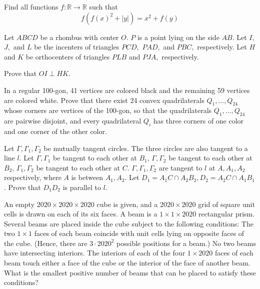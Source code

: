 \documentclass[11pt]{scrartcl}
\begin{document}
\begin{problem}[514210607042538]
Find all functions $f : \mathbb{R} \to \mathbb{R}$ such that
$$f(f(x)^2 + |y|) = x^2 + f(y)$$
\end{problem}
\begin{problem}[857598260795435]
Let $ ABCD $ be a rhombus with center $ O. $ $ P $ is a point lying on the side $ AB. $ Let $ I, $ $ J, $ and $ L $ be the incenters of triangles $ PCD, $ $ PAD, $ and $PBC, $ respectively. Let $ H $ and $ K $ be orthocenters of triangles $ PLB $ and $ PJA, $ respectively.

Prove that $ OI \perp HK. $
\end{problem}
\begin{problem}[2749225075653830789]
	In a regular 100-gon, 41 vertices are colored black and the remaining 59 vertices are colored white. Prove that there exist 24 convex quadrilaterals $Q_{1}, \ldots, Q_{24}$ whose corners are vertices of the 100-gon, so that
the quadrilaterals $Q_{1}, \ldots, Q_{24}$ are pairwise disjoint, and
every quadrilateral $Q_{i}$ has three corners of one color and one corner of the other color.
\end{problem}
\begin{problem}[1121095467606378762]
	Let $\Gamma, \Gamma_1, \Gamma_2$ be mutually tangent circles. The three circles are also tangent to a line $l$. Let $\Gamma, \Gamma_1$ be tangent to each other at $B_1$, $\Gamma, \Gamma_2$ be tangent to each other at $B_2$, $\Gamma_1, \Gamma_2$ be tangent to each other at $C$. $\Gamma, \Gamma_1, \Gamma_2$ are tangent to $l$ at $A, A_1, A_2$ respectively, where $A$ is between $A_1,A_2$. Let $D_1 = A_1C \cap A_2B_2, D_2 = A_2C \cap A_1B_1$. Prove that $D_1D_2$ is parallel to $l$.
\end{problem}
\begin{problem}[4320337590540710547]
	An empty $2020 \times 2020 \times 2020$ cube is given, and a $2020 \times 2020$ grid of square unit cells is drawn on each of its six faces. A beam is a $1 \times 1 \times 2020$ rectangular prism. Several beams are placed inside the cube subject to the following conditions:
The two $1 \times 1$ faces of each beam coincide with unit cells lying on opposite faces of the cube. (Hence, there are $3 \cdot {2020}^2$ possible positions for a beam.)
No two beams have intersecting interiors.
The interiors of each of the four $1 \times 2020$ faces of each beam touch either a face of the cube or the interior of the face of another beam.
What is the smallest positive number of beams that can be placed to satisfy these conditions?
\end{problem}
\end{document}
